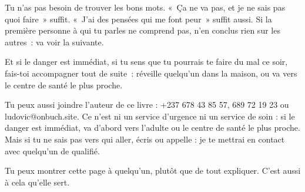 \documentclass[10.5pt,twoside,openright]{book}
\begin{document}
Tu n’as pas besoin de trouver les bons mots. « Ça ne va pas, et je ne sais pas quoi faire » suffit. « J’ai des pensées qui me font peur » suffit aussi. Si la première personne à qui tu parles ne comprend pas, n’en conclus rien sur les autres : va voir la suivante.

Et si le danger est immédiat, si tu sens que tu pourrais te faire du mal ce soir, fais-toi accompagner tout de suite : réveille quelqu’un dans la maison, ou va vers le centre de santé le plus proche.

Tu peux aussi joindre l’auteur de ce livre : +237 678 43 85 57, 689 72 19 23 ou ludovic@onbuch.site. Ce n’est ni un service d’urgence ni un service de soin : si le danger est immédiat, va d’abord vers l’adulte ou le centre de santé le plus proche. Mais si tu ne sais pas vers qui aller, écris ou appelle : je te mettrai en contact avec quelqu’un de qualifié.

Tu peux montrer cette page à quelqu’un, plutôt que de tout expliquer. C’est aussi à cela qu’elle sert.
\end{document}
